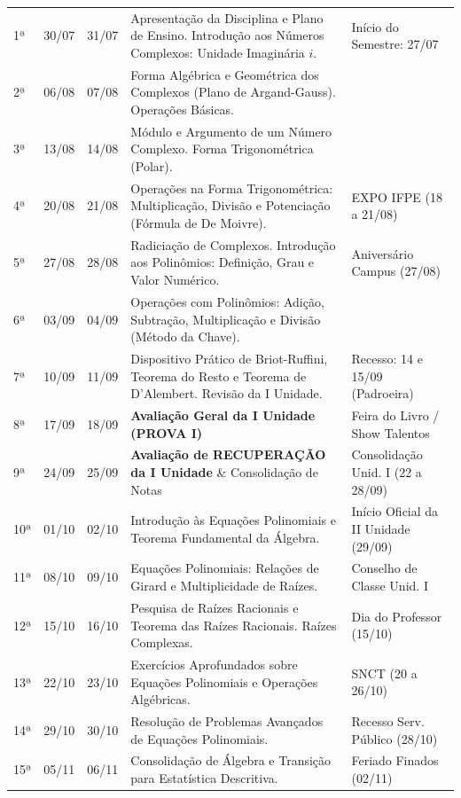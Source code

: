 \documentclass[10pt,a4paper]{article}
\begin{document}
\begin{longtable}{p{0.8cm} p{1.8cm} p{1.8cm} p{7.5cm} p{4.2cm}}
1ª & 30/07 & 31/07 & Apresentação da Disciplina e Plano de Ensino. Introdução aos Números Complexos: Unidade Imaginária $i$. & Início do Semestre: 27/07 \\
\rowcolor{lightgrey}
2ª & 06/08 & 07/08 & Forma Algébrica e Geométrica dos Complexos (Plano de Argand-Gauss). Operações Básicas. & \\
3ª & 13/08 & 14/08 & Módulo e Argumento de um Número Complexo. Forma Trigonométrica (Polar). & \\
\rowcolor{lightgrey}
4ª & 20/08 & 21/08 & Operações na Forma Trigonométrica: Multiplicação, Divisão e Potenciação (Fórmula de De Moivre). & EXPO IFPE (18 a 21/08) \\
5ª & 27/08 & 28/08 & Radiciação de Complexos. Introdução aos Polinômios: Definição, Grau e Valor Numérico. & Aniversário Campus (27/08) \\
\rowcolor{lightgrey}
6ª & 03/09 & 04/09 & Operações com Polinômios: Adição, Subtração, Multiplicação e Divisão (Método da Chave). & \\
7ª & 10/09 & 11/09 & Dispositivo Prático de Briot-Ruffini, Teorema do Resto e Teorema de D'Alembert. Revisão da I Unidade. & Recesso: 14 e 15/09 (Padroeira) \\
\rowcolor{lightgrey}
8ª & 17/09 & 18/09 & \textbf{Avaliação Geral da I Unidade (PROVA I)} & Feira do Livro / Show Talentos \\
9ª & 24/09 & 25/09 & \textbf{Avaliação de RECUPERAÇÃO da I Unidade} \& Consolidação de Notas & Consolidação Unid. I (22 a 28/09) \\
\rowcolor{lightgrey}
10ª & 01/10 & 02/10 & Introdução às Equações Polinomiais e Teorema Fundamental da Álgebra. & Início Oficial da II Unidade (29/09) \\
11ª & 08/10 & 09/10 & Equações Polinomiais: Relações de Girard e Multiplicidade de Raízes. & Conselho de Classe Unid. I \\
\rowcolor{lightgrey}
12ª & 15/10 & 16/10 & Pesquisa de Raízes Racionais e Teorema das Raízes Racionais. Raízes Complexas. & Dia do Professor (15/10) \\
13ª & 22/10 & 23/10 & Exercícios Aprofundados sobre Equações Polinomiais e Operações Algébricas. & SNCT (20 a 26/10) \\
\rowcolor{lightgrey}
14ª & 29/10 & 30/10 & Resolução de Problemas Avançados de Equações Polinomiais. & Recesso Serv. Público (28/10) \\
15ª & 05/11 & 06/11 & Consolidação de Álgebra e Transição para Estatística Descritiva. & Feriado Finados (02/11) \\

\end{longtable}
\end{document}
